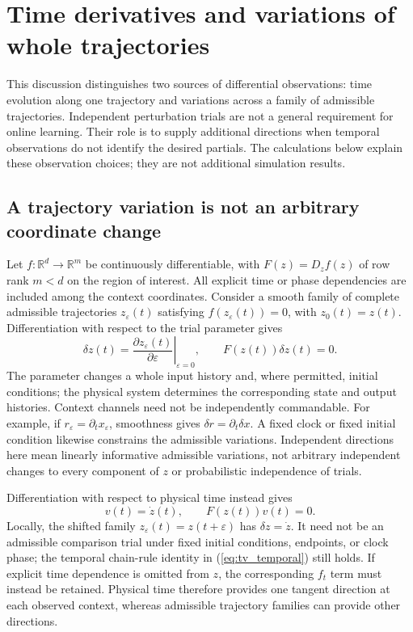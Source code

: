 \section{Time derivatives and variations of whole trajectories}
\label{sec:trajectory_variations}
This discussion distinguishes two sources of differential observations:
time evolution along one trajectory and variations across a family of
admissible trajectories. Independent perturbation trials are not a general
requirement for online learning. Their role is to supply additional
directions when temporal observations do not identify the desired partials.
The calculations below explain these observation choices; they are not
additional simulation results.

\subsection{A trajectory variation is not an arbitrary coordinate change}
Let $f:\mathbb R^d\to\mathbb R^m$ be continuously differentiable, with
$F(z)=D_zf(z)$ of row rank $m<d$ on the region of interest. All explicit
time or phase dependencies are included among the context coordinates.
Consider a smooth family of complete admissible trajectories
$z_\varepsilon(t)$ satisfying $f(z_\varepsilon(t))=0$, with
$z_0(t)=z(t)$. Differentiation with respect to the trial parameter gives
\begin{equation}
 \delta z(t)=\left.\frac{\partial z_\varepsilon(t)}{\partial\varepsilon}
                    \right|_{\varepsilon=0},
 \qquad F(z(t))\delta z(t)=0.
 \label{eq:tv_family}
\end{equation}
The parameter changes a whole input history and, where permitted, initial
conditions; the physical system determines the corresponding state and
output histories. Context channels need not be independently commandable.
For example, if $r_\varepsilon=\partial_t x_\varepsilon$, smoothness gives
$\delta r=\partial_t\delta x$. A fixed clock or fixed initial condition
likewise constrains the admissible variations. Independent directions here
mean linearly informative admissible variations, not arbitrary independent
changes to every component of $z$ or probabilistic independence of trials.

Differentiation with respect to physical time instead gives
\begin{equation}
 v(t)=\dot z(t),\qquad F(z(t))v(t)=0.
 \label{eq:tv_temporal}
\end{equation}
Locally, the shifted family $z_\varepsilon(t)=z(t+\varepsilon)$ has
$\delta z=\dot z$. It need not be an admissible comparison trial under fixed
initial conditions, endpoints, or clock phase; the temporal chain-rule
identity in (\ref{eq:tv_temporal}) still holds. If explicit time dependence
is omitted from $z$, the corresponding $f_t$ term must instead be retained.
Physical time therefore provides one tangent direction at each observed
context, whereas admissible trajectory families can provide other directions.

